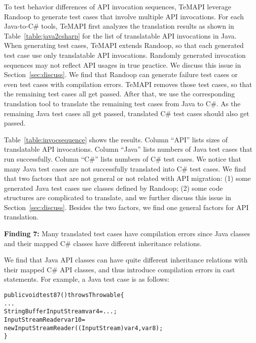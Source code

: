 To test behavior differences of API invocation sequences, TeMAPI leverage Randoop to generate test cases that involve multiple API invocations. For each Java-to-C\# tools, TeMAPI first analyzes the translation results as shown in Table~\ref{table:java2csharp} for the list of translatable API invocations in Java. When generating test cases, TeMAPI extends Randoop, so that each generated test case use only translatable API invocations. Randomly generated invocation sequences may not reflect API usages in true practice. We discuss this issue in Section~\ref{sec:discuss}. We find that Randoop can generate failure test cases or even test cases with compilation errors. TeMAPI removes those test cases, so that the remaining test cases all get passed. After that, we use the corresponding translation tool to translate the remaining test cases from Java to C\#. As the remaining Java test cases all get passed, translated C\# test cases should also get passed.

Table~\ref{table:invocsequence} shows the results. Column ``API'' lists sizes of translatable API invocations. Column ``Java'' lists numbers of Java test cases that run successfully. Column ``C\#'' lists numbers of C\# test cases. We notice that many Java test cases are not successfully translated into C\# test cases. We find that two factors that are not general or not related with API migration: (1) some generated Java test cases use classes defined by Randoop; (2) some code structures are complicated to translate, and we further discuss this issue in Section~\ref{sec:discuss}. Besides the two factors, we find one general factors for API translation.

\textbf{Finding 7:} Many translated test cases have compilation errors since Java classes and their mapped C\# classes have different inheritance relations.

We find that Java API classes can have quite different inheritance relations with their mapped C\# API classes, and thus introduce compilation errors in cast statements. For example, a Java test case is as follows:

\begin{CodeOut}%
\begin{alltt}
public void test87() throws Throwable\{
  ...
  StringBufferInputStream var4=...;
  InputStreamReader var10=
    new InputStreamReader((InputStream)var4, var8);
\}
\end{alltt}
\end{CodeOut}

